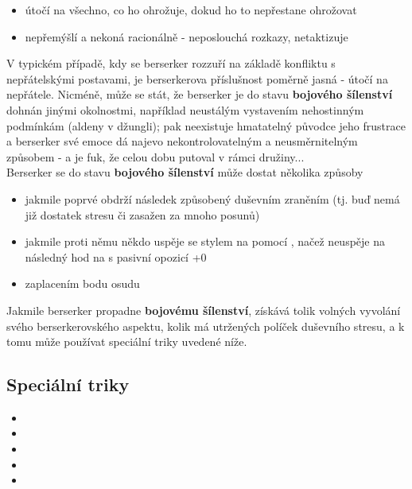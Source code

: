 \begin{tcolorbox}[%
    enhanced, 
    breakable,
    skin first=enhanced,
    skin middle=enhanced,
    skin last=enhanced,
    ]{}
\begin{itemize}
\item útočí na všechno, co ho ohrožuje, dokud ho to nepřestane ohrožovat
\item nepřemýšlí a nekoná racionálně - neposlouchá rozkazy, netaktizuje
\end{itemize}
V typickém případě, kdy se berserker rozzuří na základě konfliktu s nepřátelskými postavami, je berserkerova příslušnost poměrně jasná - útočí na nepřátele. Nicméně, může se stát, že berserker je do stavu \textbf{bojového šílenství} dohnán jinými okolnostmi, například neustálým vystavením nehostinným podmínkám (aldeny v džungli); pak neexistuje hmatatelný původce jeho frustrace a berserker své emoce dá najevo nekontrolovatelným a neusměrnitelným způsobem - a je fuk, že celou dobu putoval v rámci družiny...\\
Berserker se do stavu \textbf{bojového šílenství} může dostat několika způsoby
\begin{itemize}
\item jakmile poprvé obdrží následek způsobený duševním zraněním (tj. buď nemá již dostatek stresu či zasažen za mnoho posunů)
\item jakmile proti němu někdo uspěje se stylem na  pomocí , načež neuspěje na následný hod na  s pasivní opozicí +0
\item zaplacením bodu osudu
\end{itemize}

Jakmile berserker propadne \textbf{bojovému šílenství}, získává tolik volných vyvolání svého berserkerovského aspektu, kolik má utržených políček duševního stresu, a k tomu může používat speciální triky uvedené níže.

\subsection*{Speciální triky}
\begin{itemize}
\item {}
\item {}
\item {}
\item {}
\item {}
\end{itemize}
\end{tcolorbox}





